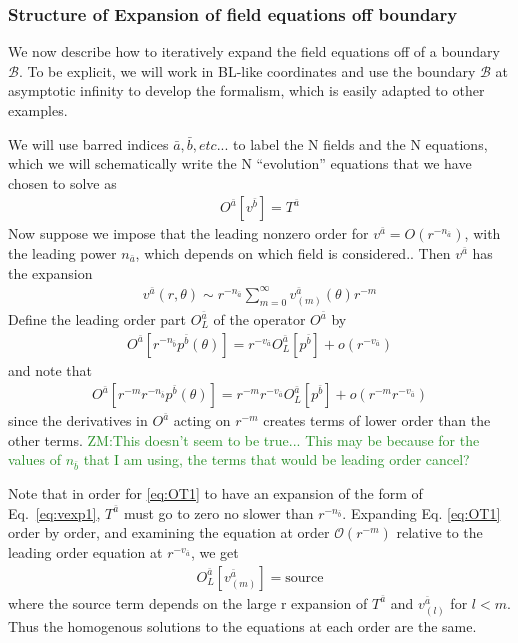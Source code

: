 \documentclass[aps,prd,amsmath,showpacs,amssymb,superscriptaddress,nofootinbib,longbibliography,eqsecnum,preprintnumbers]{revtex4-1}
\newcommand{\zach}[1]{\textcolor{ForestGreen}{#1}}
\begin{document}
\subsubsection{Structure of Expansion of field equations off boundary}

We now describe how to iteratively expand the field equations off of a boundary $\mathcal{B}$. To be explicit, we will work in BL-like coordinates and use the boundary $\mathcal{B}$ at asymptotic infinity to develop the formalism, which is easily adapted to other examples.

 We will use barred indices $\bar a, \bar b, etc...$ to label the N fields and the N equations, which we will schematically write the N ``evolution'' equations that we have chosen to solve as 
\begin{align}
O^{\bar a}[v^{\bar b}]=T^{\bar a} \label{eq:OT1}
\end{align}
Now suppose we impose that the leading nonzero order for $v^{\bar a}=O(r^{-n_{\bar a}})$, with the leading power $n_{\bar a}$, which depends on which field is considered.. Then $v^{\bar a}$ has the expansion
\begin{align}
v^{\bar a}(r,\theta) \sim r^{-n_{\bar a}}\sum_{m=0}^\infty v^{\bar a}_{(m)}(\theta)r^{-m} \label{eq:vexp1}
\end{align}
Define the leading order part $O^{\bar a}_L$ of the operator $O^{\bar a}$ by
\begin{align}
O^{\bar a}[r^{-n_{\bar b}}p^{\bar b}(\theta)]=r^{-v_{\bar a}}O^{\bar a}_L[p^{\bar b}] +o(r^{-v_{\bar a}})
\end{align}
and note that
\begin{align}
O^{\bar a}[r^{-m} r^{-n_{\bar b}}p^{\bar b}(\theta)]=r^{-m}r^{-v_{\bar a}}O^{\bar a}_L[p^{\bar b}] +o(r^{-m}r^{-v_{\bar a}})
\end{align}
since the derivatives in $O^{\bar a}$ acting on $r^{-m}$ creates terms of lower order than the other terms. \zach{ZM:This doesn't seem to be true... This may be because for the values of $n_{\bar b}$ that I am using, the terms that would be leading order cancel?}

Note that in order for \eqref{eq:OT1} to have an expansion of the form of Eq.~\eqref{eq:vexp1}, $T^{\bar a}$ must go to zero no slower than $r^{-n_{\bar b}}$.
Expanding  Eq. \eqref{eq:OT1} order by order, and examining the equation at order $\mathcal{O}(r^{-m})$ relative to the leading order equation at $r^{-v_{\bar a}}$, we get 
\begin{align}
O^{\bar a}_L[v_{(m)}^{\bar a}]= \text{source} \label{eq:seq}
\end{align}
where the source term depends on the large r expansion of $T^{\bar a}$ and $v_{(l)}^{\bar a}$ for $l<m$. Thus the homogenous solutions to the equations at each order are the same. 
\end{document}
